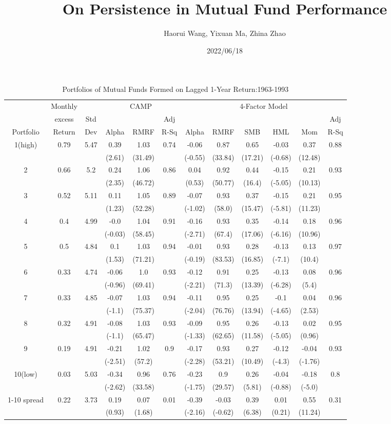 \documentclass[a4paper]{article}
\title{On Persistence in Mutual Fund Performance}
\author{Haorui Wang, Yixuan Ma, Zhina Zhao}
\date{2022/06/18}
\begin{document}
\maketitle
\begin{table}[h!]
\centering
\begin{tabular}{c cc ccc cccccc} 
\toprule[1.5pt]
  &  Monthly &  & \multicolumn{3}{c}{CAMP} &  \multicolumn{6}{c}{4-Factor Model}\\
  & excess& Std &   &  & Adj &   &  &  &  &  & Adj\\
 Portfolio & Return & Dev & Alpha  & RMRF & R-Sq &  Alpha  & RMRF & SMB & HML & Mom &  R-Sq\\

\toprule[1.5pt]
1(high)&0.79&5.47&0.39&1.03&0.74&-0.06&0.87&0.65&-0.03&0.37&0.88\\
&&&(2.61)&(31.49)&&(-0.55)&(33.84)&(17.21)&(-0.68)&(12.48)&\\
2&0.66&5.2&0.24&1.06&0.86&0.04&0.92&0.44&-0.15&0.21&0.93\\
&&&(2.35)&(46.72)&&(0.53)&(50.77)&(16.4)&(-5.05)&(10.13)&\\
3&0.52&5.11&0.11&1.05&0.89&-0.07&0.93&0.37&-0.15&0.21&0.95\\
&&&(1.23)&(52.28)&&(-1.02)&(58.0)&(15.47)&(-5.81)&(11.23)&\\
4&0.4&4.99&-0.0&1.04&0.91&-0.16&0.93&0.35&-0.14&0.18&0.96\\
&&&(-0.03)&(58.45)&&(-2.71)&(67.4)&(17.06)&(-6.16)&(10.96)&\\
5&0.5&4.84&0.1&1.03&0.94&-0.01&0.93&0.28&-0.13&0.13&0.97\\
&&&(1.53)&(71.21)&&(-0.19)&(83.53)&(16.85)&(-7.1)&(10.4)&\\
6&0.33&4.74&-0.06&1.0&0.93&-0.12&0.91&0.25&-0.13&0.08&0.96\\
&&&(-0.96)&(69.41)&&(-2.21)&(71.3)&(13.39)&(-6.28)&(5.4)&\\
7&0.33&4.85&-0.07&1.03&0.94&-0.11&0.95&0.25&-0.1&0.04&0.96\\
&&&(-1.1)&(75.37)&&(-2.04)&(76.76)&(13.94)&(-4.65)&(2.53)&\\
8&0.32&4.91&-0.08&1.03&0.93&-0.09&0.95&0.26&-0.13&0.02&0.95\\
&&&(-1.1)&(65.47)&&(-1.33)&(62.65)&(11.58)&(-5.05)&(0.96)&\\
9&0.19&4.91&-0.21&1.02&0.9&-0.17&0.93&0.27&-0.12&-0.04&0.93\\
&&&(-2.51)&(57.2)&&(-2.28)&(53.21)&(10.49)&(-4.3)&(-1.76)&\\
10(low)&0.03&5.03&-0.34&0.96&0.76&-0.23&0.9&0.26&-0.04&-0.18&0.8\\
&&&(-2.62)&(33.58)&&(-1.75)&(29.57)&(5.81)&(-0.88)&(-5.0)&\\
1-10 spread&0.22&3.73&0.19&0.07&0.01&-0.39&-0.03&0.39&0.01&0.55&0.31\\
&&&(0.93)&(1.68)&&(-2.16)&(-0.62)&(6.38)&(0.21)&(11.24)&\\

\toprule[1.5pt]
\end{tabular}
\caption{Portfolios of Mutual Funds Formed on Lagged 1-Year Return:1963-1993}
\label{table:1}
\end{table}
     
\end{document}
